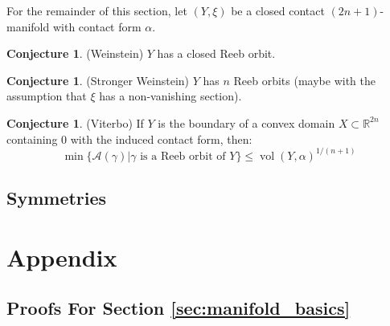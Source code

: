 \documentclass[12pt]{article}
\theoremstyle{definition}
\numberwithin{equation}{section}
\newtheorem{conjecture}[theorem]{Conjecture}
\newcommand{\R}{{\mathbb R}}
\newcommand{\op}{\operatorname}
\begin{document}
For the remainder of this section, let $(Y,\xi)$ be a closed contact $(2n+1)$-manifold with contact form $\alpha$.

\begin{conjecture} \label{conj:weinstein} (Weinstein) $Y$ has a closed Reeb orbit.
\end{conjecture}

\begin{conjecture} (Stronger Weinstein) $Y$ has $n$ Reeb orbits (maybe with the assumption that $\xi$ has a non-vanishing section).
\end{conjecture}

\begin{conjecture} (Viterbo) If $Y$ is the boundary of a convex domain $X \subset \R^{2n}$ containing $0$ with the induced contact form, then:
\[
\min\{\mathcal{A}(\gamma)| \gamma \text{ is a Reeb orbit of }Y\} \le \op{vol}(Y,\alpha)^{1/(n+1)}
\]
\end{conjecture}

\subsection{Symmetries} 

\section{Appendix}

\subsection{Proofs For Section \ref{sec:manifold_basics}} \label{appendix:proofs_for_manifold_basics}
\end{document}
